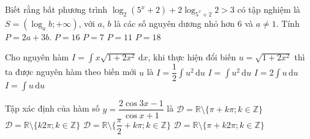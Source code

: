 \begin{ex}%
Biết rằng bất phương trình $\log_2(5^x+2)+2\log_{5^x+2}2>3$ có tập nghiệm là\break $S=\left(\log_a b;+\infty\right)$, với $a$, $b$ là các số nguyên dương nhỏ hơn $6$ và $a\ne 1$. Tính $P=2a+3b$.
\choice
{\True $P=16$}
{$P=7$}
{$P=11$}
{$P=18$}
\end{ex}

\begin{ex}%
Cho nguyên hàm $I=\displaystyle\int x\sqrt{1+2x^2}\mathrm{\,d}x$, khi thực hiện đổi biến $u=\sqrt{1+2x^2}$ thì ta được nguyên hàm theo biến mới $u$ là
\choice
{\True $I=\dfrac{1}{2}\displaystyle\int u^2\mathrm{\,d}u$}
{$I=\displaystyle\int u^2\mathrm{\,d}u$}
{$I=2\displaystyle\int u\mathrm{\,d}u$}
{$I=\displaystyle\int u\mathrm{\,d}u$}
\end{ex}

\begin{ex}%
Tập xác định của hàm số $y=\dfrac{2\cos 3x-1}{\cos x+1}$ là
\choice
{$\mathscr{D}=\mathbb{R}\setminus \{\pi+k\pi;k\in\mathbb{Z}\}$}
{$\mathscr{D}=\mathbb{R}\setminus \{k2\pi;k\in\mathbb{Z}\}$}
{$\mathscr{D}=\mathbb{R}\setminus \{\dfrac{\pi}{2}+k\pi;k\in\mathbb{Z}\}$}
{\True $\mathscr{D}=\mathbb{R}\setminus \{\pi+k2\pi;k\in\mathbb{Z}\}$}
\end{ex}


